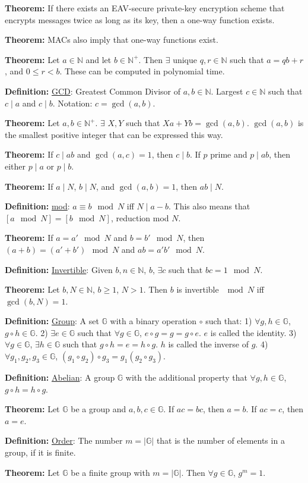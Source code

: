\documentclass[10pt]{article}
\newcommand{\N}{\mathbb{N}}
\newcommand{\G}{\mathbb{G}}
\newcommand{\defn}[1]{{\bf Definition:} \underline{#1}}
\newcommand{\thm}[1]{{\bf Theorem:} \underline{#1}}
\begin{document}
\begin{multicols}{4}
\thm{}If there exists an EAV-secure private-key encryption scheme that encrypts messages twice as long as its key, then a one-way function exists.

\thm{}MACs also imply that one-way functions exist.

\thm{}Let $a\in\N$ and let $b\in\N^+$. Then $\exists$ unique $q,r\in\N$ such that $a=qb+r$, and $0\leq r<b$. These can be computed in polynomial time.

\defn{GCD}: Greatest Common Divisor of $a,b\in\N$. Largest $c\in\N$ such that $c\mid a$ and $c\mid b$. Notation: $c=\gcd(a,b)$.

\thm{}Let $a,b\in\N^+$. $\exists$ $X,Y$ such that $Xa+Yb=\gcd(a,b)$. $\gcd(a,b)$ is the smallest positive integer that can be expressed this way.

\thm{}If $c\mid ab$ and $\gcd(a,c)=1$, then $c\mid b$. If $p$ prime and $p\mid ab$, then either $p\mid a$ or $p\mid b$.

\thm{}If $a\mid N$, $b\mid N$, and $\gcd(a,b)=1$, then $ab\mid N$.

\defn{mod}: $a\equiv b\mod{N}$ iff $N\mid{a-b}$. This also means that $[a\mod{N}]=[b\mod{N}]$, reduction mod $N$.

\thm{}If $a=a'\mod{N}$ and $b=b'\mod{N}$, then $(a+b)=(a'+b')\mod{N}$ and $ab=a'b'\mod{N}$.

\defn{Invertible}: Given $b,n\in\N$, $b$, $\exists c$ such that $bc=1\mod{N}$.

\thm{}Let $b,N\in\N$, $b\geq1$, $N>1$. Then $b$ is invertible $\mod{N}$ iff $\gcd(b,N)=1$.

\defn{Group}: A set $\G$ with a binary operation $\circ$ such that: 1) $\forall g,h\in\G$, $g\circ h\in\G$. 2) $\exists e\in\G$ such that $\forall g\in\G$, $e\circ g=g=g\circ e$. $e$ is called the identity. 3) $\forall g\in\G$, $\exists h\in\G$ such that $g\circ h=e=h\circ g$. $h$ is called the inverse of $g$. 4) $\forall g_1,g_2,g_3\in\G$, $(g_1\circ g_2)\circ g_3=g_1(g_2\circ g_3)$.

\defn{Abelian}: A group $\G$ with the additional property that $\forall g,h\in\G$, $g\circ h=h\circ g$.

\thm{}Let $\G$ be a group and $a,b,c\in\G$. If $ac=bc$, then $a=b$. If $ac=c$, then $a=e$.

\defn{Order}: The number $m=|\G|$ that is the number of elements in a group, if it is finite.

\thm{}Let $\G$ be a finite group with $m=|\G|$. Then $\forall g\in\G$, $g^m=1$.


\end{multicols}
\end{document}
